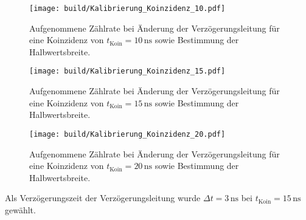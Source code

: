 \begin{figure}[H] 
    \centering
    \texttt{[image: build/Kalibrierung\_Koinzidenz\_10.pdf]}
    \caption{Aufgenommene Zählrate bei Änderung der Verzögerungsleitung für eine Koinzidenz von $t_\text{Koin} = 10 \, \unit{\nano\second}$ sowie Bestimmung der Halbwertsbreite.}
    \label{fig:koin_10}
\end{figure}

\begin{figure}[H] 
    \centering
    \texttt{[image: build/Kalibrierung\_Koinzidenz\_15.pdf]}
    \caption{Aufgenommene Zählrate bei Änderung der Verzögerungsleitung für eine Koinzidenz von $t_\text{Koin} = 15 \, \unit{\nano\second}$ sowie Bestimmung der Halbwertsbreite.}
    \label{fig:koin_15}
\end{figure}

\begin{figure}[H]
    \centering
    \texttt{[image: build/Kalibrierung\_Koinzidenz\_20.pdf]}
    \caption{Aufgenommene Zählrate bei Änderung der Verzögerungsleitung für eine Koinzidenz von $t_\text{Koin} = 20 \, \unit{\nano\second}$ sowie Bestimmung der Halbwertsbreite.}
    \label{fig:koin_20}
\end{figure}

Als Verzögerungszeit der Verzögerungsleitung wurde $\Delta t = 3 \,\unit{\nano\second}$ bei $t_\text{Koin} = 15 \, \unit{\nano\second}$ gewählt.

